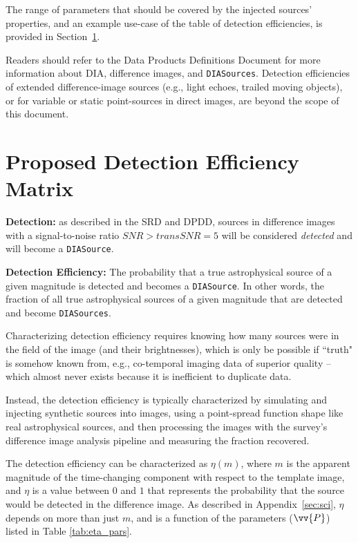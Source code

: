 \documentclass[DM,lsstdraft,toc]{lsstdoc}
\begin{document}
The range of parameters that should be covered by the injected sources' properties, and an example use-case of the table of detection efficiencies, is provided in Section~\ref{sec:proposal}. 

Readers should refer to the Data Products Definitions Document  for more information about DIA, difference images, and {\tt DIASources}.
Detection efficiencies of extended difference-image sources (e.g., light echoes, trailed moving objects), or for variable or static point-sources in direct images, are beyond the scope of this document.


\clearpage
\section{Proposed Detection Efficiency Matrix}\label{sec:proposal}

{\bf Detection:} as described in the SRD and DPDD, sources in difference images with a signal-to-noise ratio $SNR > {transSNR} = 5$ will be considered {\it detected} and will become a {\tt DIASource}.
 
{\bf Detection Efficiency:} The probability that a true astrophysical source of a given magnitude is detected and becomes a {\tt DIASource}. In other words, the fraction of all true astrophysical sources of a given magnitude that are detected and become {\tt DIASources}. 

Characterizing detection efficiency requires knowing how many sources were in the field of the image (and their brightnesses), which is only be possible if ``truth" is somehow known from, e.g., co-temporal imaging data of superior quality -- which almost never exists because it is inefficient to duplicate data.

Instead, the detection efficiency is typically characterized by simulating and injecting synthetic sources into images, using a point-spread function shape like real astrophysical sources, and then processing the images with the survey's difference image analysis pipeline and measuring the fraction recovered.

The detection efficiency can be characterized as $\eta(m)$, where $m$ is the apparent magnitude of the time-changing component with respect to the template image, and $\eta$ is a value between $0$ and $1$ that represents the probability that the source would be detected in the difference image.
As described in Appendix~\ref{sec:sci}, $\eta$ depends on more than just $m$, and is a function of the parameters ($\vv{P}$) listed in Table \ref{tab:eta_pars}.
\end{document}
